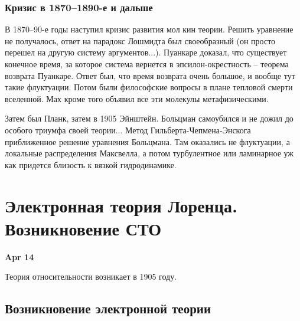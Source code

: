 \documentclass[a4paper, 12pt]{article}
\begin{document}
\subsubsection{Кризис в 1870--1890-е и дальше}

В 1870--90-е годы наступил кризис развития мол кин теории. Решить 
уравнение не получалось, ответ на парадокс Лошмидта был своеобразный (он 
просто перешел на другую систему аргументов...). Пуанкаре доказал, что 
существует конечное время, за которое система вернется 
в эпсилон-окрестность -- теорема возврата Пуанкаре. Ответ был, что время 
возврата очень большое, и вообще тут такие флуктуации. Потом были 
философские вопросы в плане тепловой смерти вселенной. Мах кроме того 
объявил все эти молекулы метафизическими.

Затем был Планк, затем в 1905 Эйнштейн. Больцман самоубился и не дожил 
до особого триумфа своей теории... Метод Гильберта-Чепмена-Энскога 
приближенное решение уравнения Больцмана. Там оказались не флуктуации, 
а локальные распределения Максвелла, а потом турбулентное или ламинарное 
уж как придется близость к вязкой гидродинамике.


\section{Электронная теория Лоренца. Возникновение СТО}

\hfill \textbf{Apr 14}

Теория относительности возникает в 1905 году.

\subsection{Возникновение электронной теории}
\end{document}
